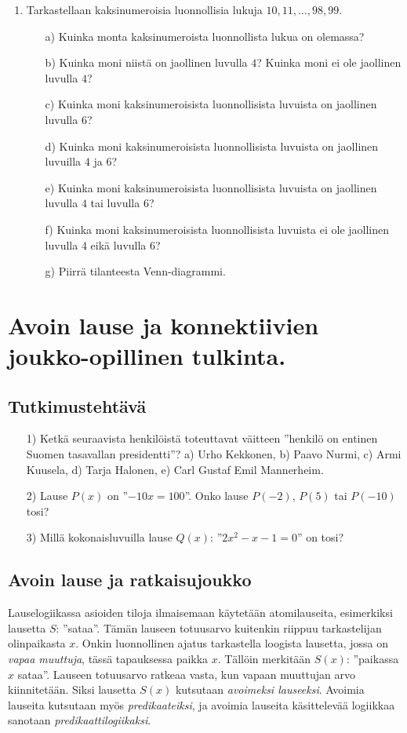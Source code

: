 \begin{enumerate}
\medskip

\item Tarkastellaan kaksinumeroisia luonnollisia lukuja $10,11, \ldots ,98,99$.
\begin{itemize}
\item[a)] Kuinka monta kaksinumeroista luonnollista lukua on olemassa?
\item[b)] Kuinka moni niistä on jaollinen luvulla $4$? Kuinka moni ei ole jaollinen luvulla $4$?
\item[c)] Kuinka moni kaksinumeroisista luonnollisista luvuista on jaollinen luvulla $6$?
\item[d)] Kuinka moni kaksinumeroisista luonnollisista luvuista on jaollinen luvuilla $4$ ja $6$?
\item[e)] Kuinka moni kaksinumeroisista luonnollisista luvuista on jaollinen luvulla $4$ tai luvulla $6$?
\item[f)] Kuinka moni kaksinumeroisista luonnollisista luvuista ei ole jaollinen luvulla $4$ eikä luvulla $6$?
\item[g)] Piirrä tilanteesta Venn-diagrammi.
\end{itemize}

\end{enumerate}

\newpage


\section{Avoin lause ja konnektiivien joukko-opillinen tulkinta.}

\subsection*{Tutkimustehtävä}
\begin{itemize}
\item[1)] Ketkä seuraavista henkilöistä toteuttavat väitteen ''henkilö on entinen Suomen tasavallan presidentti''? 
a) Urho Kekkonen,  b)  Paavo Nurmi,  c)  Armi Kuusela,  d)  Tarja Halonen,  
e) Carl Gustaf Emil Mannerheim.
\item[2)] 
Lause $P(x)$ on ''$-10x = 100$''. Onko lause $P(-2)$, $P(5)$ tai $P(-10)$ tosi?
\item[3)] 
Millä kokonaisluvuilla lause $Q(x)$: ''$2x^2 - x - 1 = 0$'' on tosi?
\end{itemize}

\subsection*{Avoin lause ja ratkaisujoukko}
Lauselogiikassa asioiden tiloja ilmaisemaan käytetään atomilauseita, esimerkiksi lausetta $S$: ''sataa''. Tämän lauseen totuusarvo kuitenkin riippuu tarkastelijan olinpaikasta $x$. Onkin luonnollinen ajatus tarkastella loogista lausetta, jossa on {\em vapaa muuttuja}, tässä tapauksessa paikka $x$. Tällöin merkitään $S(x)$: ''paikassa $x$ sataa''. Lauseen totuusarvo ratkeaa vasta, kun vapaan muuttujan arvo kiinnitetään. Siksi lausetta $S(x)$ kutsutaan {\em avoimeksi lauseeksi}. Avoimia lauseita kutsutaan myös {\em predikaateiksi}, ja avoimia lauseita käsittelevää logiikkaa sanotaan {\em predikaattilogiikaksi}.

